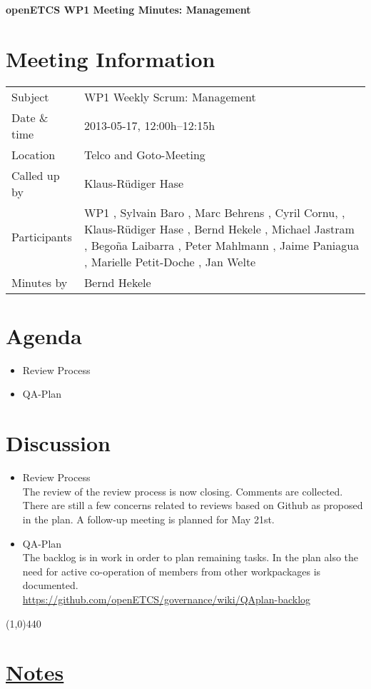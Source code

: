 \documentclass[a4paper, 11pt]{article}
\begin{document}
{\begin{center}\huge\bf openETCS WP1 Meeting Minutes: Management\end{center}}
\section{Meeting Information}

\renewcommand{\arraystretch}{1.5}
\begin{supertabular}{m{.2\textwidth}m{.8\textwidth}}
Subject & WP1 Weekly Scrum: Management\\
Date \& time & 2013-05-17, 12:00h--12:15h\\
Location & Telco and Goto-Meeting\\
Called up by & Klaus-R\"udiger Hase\\
Participants & WP1
, Sylvain Baro
, Marc Behrens
, Cyril Cornu, 
, Klaus-R\"udiger Hase
, Bernd Hekele
, Michael Jastram
, Bego\~na Laibarra
, Peter Mahlmann
, Jaime Paniagua
, Marielle Petit-Doche
, Jan Welte
\\

Minutes by & Bernd Hekele\\

\end{supertabular}
\renewcommand{\arraystretch}{1.0}


\section{{Agenda}}
\begin{itemize}
\item Review Process
\item QA-Plan
\end{itemize}

\section{Discussion}
\begin{itemize}
\item Review Process\\
The review of the review process is now closing. Comments are collected. There are still a few concerns related to reviews based on Github as proposed in the plan. A follow-up meeting is planned for May 21st.
 
\item QA-Plan\\
The backlog is in work in order to plan remaining tasks. In the plan also the need for active co-operation of members from other workpackages is documented.\\
\url{https://github.com/openETCS/governance/wiki/QAplan-backlog}

\end{itemize}

\line(1,0){440}
\section{\underline{Notes}}
\end{document}
